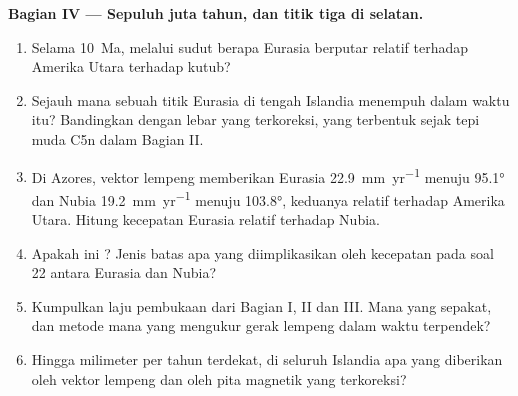 \begin{problem}
\noindent\textbf{Bagian IV --- Sepuluh juta tahun, dan titik tiga di selatan.}
\begin{enumerate}[resume]
  \item Selama \qty{10}{Ma}, melalui sudut berapa Eurasia berputar relatif terhadap Amerika Utara terhadap kutub?
  \item Sejauh mana sebuah titik Eurasia di tengah Islandia menempuh  dalam waktu itu? Bandingkan dengan lebar  yang terkoreksi, yang terbentuk sejak tepi muda C5n dalam Bagian II.
  \item Di  Azores, vektor lempeng memberikan Eurasia \qty{22.9}{mm.yr^{-1}} menuju \ang{95.1} dan Nubia \qty{19.2}{mm.yr^{-1}} menuju \ang{103.8}, keduanya relatif terhadap Amerika Utara. Hitung kecepatan Eurasia relatif terhadap Nubia.
  \item Apakah  ini ? Jenis batas apa yang diimplikasikan oleh kecepatan pada soal 22 antara Eurasia dan Nubia?
  \item Kumpulkan laju pembukaan dari Bagian I, II dan III. Mana yang sepakat, dan metode mana yang mengukur gerak lempeng dalam waktu terpendek?
  \item Hingga milimeter per tahun terdekat,  di seluruh Islandia apa yang diberikan oleh vektor lempeng dan oleh pita magnetik yang terkoreksi?
\end{enumerate}
\end{problem}
